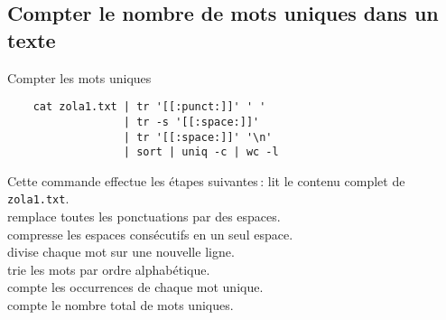 \documentclass[a4paper]{report}
\begin{document}
    \subsection{Compter le nombre de mots uniques dans un texte}
    \begin{EExample}{Compter les mots uniques}{}
        \begin{verbatim}
    cat zola1.txt | tr '[[:punct:]]' ' ' 
                  | tr -s '[[:space:]]' 
                  | tr '[[:space:]]' '\n' 
                  | sort | uniq -c | wc -l
        \end{verbatim}
        Cette commande effectue les étapes suivantes :
        lit le contenu complet de \texttt{zola1.txt}. \\
        remplace toutes les ponctuations par des espaces. \\
        compresse les espaces consécutifs en un seul espace. \\
        divise chaque mot sur une nouvelle ligne. \\
        trie les mots par ordre alphabétique. \\
        compte les occurrences de chaque mot unique. \\
        compte le nombre total de mots uniques.
    \end{EExample}
\end{document}
